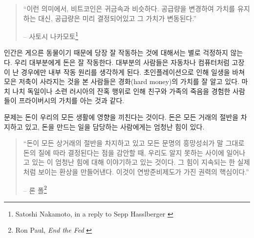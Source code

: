 \begin{quotation}\begin{samepage}
		\enquote{이런 의미에서, 비트코인은 귀금속과 비슷하다. 
		공급량을 변경하여 가치를 유지하는 대신, 공급량은 미리 결정되어있고 그 가치가 변동된다.}
		\begin{flushright} -- 사토시 나카모토\footnote{Satoshi Nakamoto, in a reply to Sepp
				Hasslberger \cite{satoshi-precious-metal}}
\end{flushright}\end{samepage}\end{quotation}



인간은 게으른 동물이기 때문에 당장 잘 작동하는 것에 대해서는 별로 걱정하지 않는다. 
우리 대부분에게 돈은 잘 작동한다.
대부분의 사람들은 자동차나 컴퓨터처럼 고장이 난 경우에만 내부 작동 원리를 생각하게 된다.
초인플레이션으로 인해 일생을 바쳐 모은 저축이 사라지는 것을 본 사람들은 경화(hard money)의 가치를 
잘 알고 있다. 마치 나치 독일이나 소련 러시아의 잔혹 행위로 인해 친구와 가족의 죽음을 경험한 사람들이 프라이버시의 가치를 아는 것과 같다.



문제는 돈이 우리의 모든 생활에 영향을 끼친다는 것이다.
돈은 모든 거래의 절반을 차지하고 있고, 
돈을 만드는 일을 담당하는 사람에게는 엄청난 힘이 있다.


\begin{quotation}\begin{samepage}
		\enquote{돈이 모든 상거래의 절반을 차지하고 있고
			모든 문명의 흥망성쇠가 말 그대로 돈의 질에 따라 결정된다는 점을 감안할 때,
			우리도 알지 못하는 사이에 일어나고 있는 이 엄청난 힘에 대해 이야기하고 있는 것이다.
			그 힘이 지속되는 한 실제처럼 보이는 환상을 만들어낸다.
			이것이 연방준비제도가 가진 권력의 핵심이다.}
		\begin{flushright} -- 론 폴\footnote{Ron Paul, \textit{End the Fed} \cite{end-the-fed}}
\end{flushright}\end{samepage}\end{quotation}

